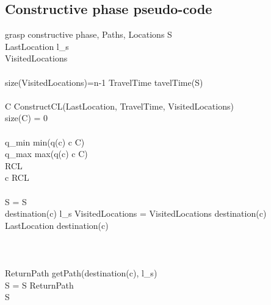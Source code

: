 \documentclass[]{report}
\begin{document}
\subsection{Constructive phase pseudo-code}
\begin{pseudocode}{grasp constructive phase}{\alpha, Paths, Locations}
\label{pc:constructive_phase}
	S \GETS \varnothing\\
	LastLocation \GETS l_{s}\\
	VisitedLocations \GETS \varnothing\\
	\\
	\WHILE \NOT size(VisitedLocations)=n-1 \DO
	\BEGIN
		TravelTime \GETS tavelTime(S)\\
		\\
		C \GETS ConstructCL(LastLocation, TravelTime, VisitedLocations)\\
		\IF size(C) = 0 \THEN
			\\
		
		\\
		q_{min} \GETS min(q(c) \quad \forall c \in C)\\
		q_{max} \GETS max(q(c) \quad \forall c \in C)\\
		RCL \\
		 c \in RCL \\
		\\
		S = S \\
		\IF destination(c) \neq l_{s} \THEN
			VisitedLocations = VisitedLocations \cup destination(c)\\
		LastLocation \GETS destination(c)\\
	\END\\
	\\
	\\
	ReturnPath \GETS getPath(destination(c), l_{s})\\
	S = S \cup ReturnPath\\
	
	\RETURN S

\end{pseudocode}
\end{document}
